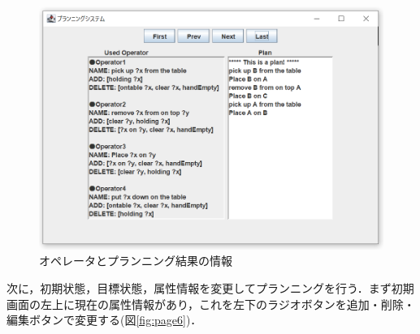 \documentclass[uplatex,12pt]{jsarticle}
\begin{document}
\begin{figure}[htbp]
  \begin{center}
    \includegraphics[scale=0.6]{images/page5.PNG}
    \caption{オペレータとプランニング結果の情報}
    \label{fig:page5}
  \end{center}
\end{figure}

\clearpage
次に，初期状態，目標状態，属性情報を変更してプランニングを行う．まず初期画面の左上に現在の属性情報があり，これを左下のラジオボタンを追加・削除・編集ボタンで変更する(図\ref{fig:page6})．\\
\end{document}

